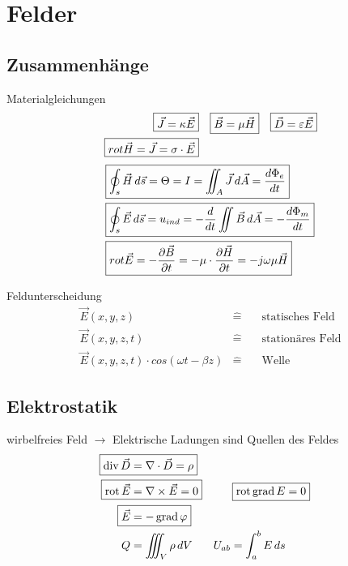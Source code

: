 \section{Felder}
\subsection{Zusammenhänge}
Materialgleichungen
\begin{align*}
    \Aboxed{\vec{J}  = \kappa\vec{E}} & \Aboxed{\vec{B}  = \mu\vec{H}}    & \Aboxed{\vec{D}  = \varepsilon\vec{E}}\\
    \Aboxed{ rot \vec{H} = \vec{J} = \sigma \cdot \vec{E}} &
\end{align*}
\begin{align*}
    \Aboxed{&\oint_s{\vec{H} \, d\vec{s}} = \Theta = I = \iint_A \vec{J}  \, d\vec{A} = \frac{d\Phi_e}{dt}} \\
    \Aboxed{&\oint_s{\vec{E} \, d\vec{s}} = u_{ind} = -\frac{d}{dt}\iint{\vec{B} \, d\vec{A}} = -\frac{d\Phi_m}{dt}} \\
    \Aboxed{&rot{\vec{E}} = -\frac{\partial\vec{B}}{\partial t} = -\mu\cdot\frac{\partial\vec{H}}{\partial t} = -j\omega\mu\vec{H}}
\end{align*}

Feldunterscheidung
\begin{align*}
     & \vec{E}(x,y,z)                               & \widehat= & \quad\text{statisches Feld}  & \\
     & \vec{E}(x,y,z,t)                             & \widehat= & \quad\text{stationäres Feld} & \\
     & \vec{E}(x,y,z,t)\cdot cos(\omega t -\beta z) & \widehat= & \quad\text{Welle}            &
\end{align*}

\subsection{Elektrostatik}
\textbullet wirbelfreies Feld $\rightarrow$ Elektrische Ladungen sind Quellen des
Feldes
\begin{align*}
    \Aboxed{\opdiv \vec{D} & = \nabla \cdot \vec{D}  = \rho}\\
    \Aboxed{\oprot \vec{E} & = \nabla \times \vec{E} = 0} & \Aboxed{\oprot \opgrad E & = 0}\\
    \Aboxed{\vec{E} & = - \opgrad \varphi} \\
    Q &= \iiint_V \rho \, dV & U_{ab} = \int_{a}^{b} E \, ds
\end{align*}

